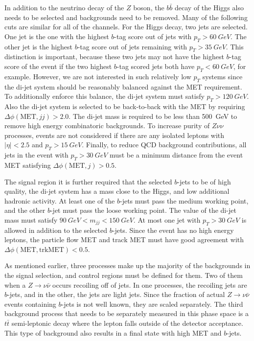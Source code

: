 In addition to the neutrino decay of the $Z$ boson, the $b\bar{b}$ decay
of the Higgs also needs to be selected and backgrounds need to be removed.
Many of the following cuts are similar for all of the channels.
For the Higgs decay, two jets are selected.
One jet is the one with the highest $b$-tag score out of jets with $p_T > \SI{60}{GeV}$.
The other jet is the highest $b$-tag score out of jets remaining with $p_T > \SI{35}{GeV}$.
This distinction is important, because these two jets may not have the highest
$b$-tag score of the event if the two highest $b$-tag scored jets both have
$p_T < \SI{60}{GeV}$, for example.
However, we are not interested in such relatively low $p_T$ systems since
the di-jet system should be reasonably balanced against the MET requirement.
To additionally enforce this balance, the di-jet system must satisfy $p_T > \SI{120}{GeV}$.
Also the di-jet system is selected to be back-to-back with the MET
by requiring $\Delta\phi(\mathrm{MET}, jj) > 2.0$.
The di-jet mass is required to be less than \SI{500}{GeV} to remove high energy
combinatoric backgrounds.
To increase purity of $Z\nu\nu$ processes,
events are not considered if there are any isolated leptons
with $|\eta| < 2.5$ and $p_T > \SI{15}{GeV}$.
Finally, to reduce QCD background contributions,
all jets in the event with $p_T > \SI{30}{GeV}$
must be a minimum distance from the event MET satisfying
$\Delta \phi(\mathrm{MET}, j) > 0.5$.

The signal region it is further required that
the selected $b$-jets to be of high quality,
the di-jet system has a mass close to the Higgs,
and low additional hadronic activity.
At least one of the $b$-jets must pass the medium working point,
and the other $b$-jet must pass the loose working point.
The value of the di-jet mass must satisfy $\SI{90}{GeV} < m_{jj} < \SI{150}{GeV}$.
At most one jet with $p_T > \SI{30}{GeV}$ is allowed
in addition to the selected $b$-jets.
Since the event has no high energy leptons,
the particle flow MET and track MET must have good agreement with
$\Delta \phi(\mathrm{MET}, \mathrm{trkMET}) < 0.5$.

As mentioned earlier, three processes make up the majority of the backgrounds
in the signal selection, and control regions must be defined for them.
Two of them when a $Z \rightarrow \nu\bar{\nu}$ occurs recoiling off of jets.
In one processes, the recoiling jets are $b$-jets, and in the other, the jets are light jets.
Since the fraction of actual $Z \rightarrow \nu\bar{\nu}$ events
containing $b$-jets is not well known, they are scaled separately.
The third background process that needs to be separately measured in this phase space
is a $t\bar{t}$ semi-leptonic decay
where the lepton falls outside of the detector acceptance.
This type of background also results in a final state with high MET and $b$-jets.

